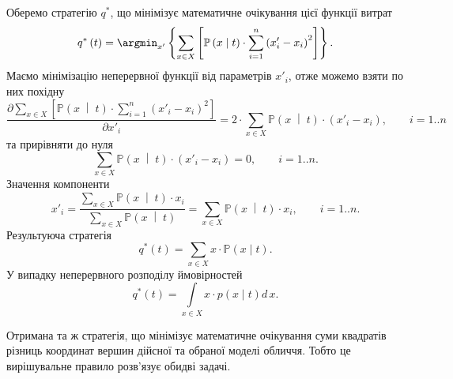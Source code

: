 Оберемо стратегію $q^*$,
що мінімізує математичне очікування цієї функції витрат
\begin{equation*}
  q^* \left( t \right)
  = \argmin_{x'} \left\{
    \sum\limits_{x \in X} \left[
        \mathbb{P} \left( x \;\middle|\;  t \right)
        \cdot \sum_{i = 1}^n \left( x'_i - x_i \right)^2
      \right]
    \right\}.
\end{equation*}
Маємо мінімізацію неперервної функції від параметрів $x'_i$,
отже можемо взяти по них похідну
\begin{equation*}
  \frac{\partial \sum\limits_{x \in X} \left[
      \mathbb{P} \left( x \;\middle|\;  t \right)
      \cdot \sum\limits_{i = 1}^n \left( x'_i - x_i \right)^2
  \right]}{\partial x'_i}
  = 2 \cdot \sum_{x \in X} \mathbb{P} \left( x \;\middle|\;  t \right)
    \cdot \left( x'_i - x_i \right), \qquad i = 1..n
\end{equation*}
та прирівняти до нуля
\begin{equation*}
  \sum_{x \in X} \mathbb{P} \left( x \;\middle|\;  t \right)
  \cdot \left( x'_i - x_i \right) = 0, \qquad i = 1..n.
\end{equation*}
Значення компоненти
\begin{equation*}
  x'_i = \frac{\sum\limits_{x \in X}
    \mathbb{P} \left( x \;\middle|\;  t \right) \cdot x_i}
    {\sum\limits_{x \in X}
      \mathbb{P} \left( x \;\middle|\;  t \right)}
  = \sum\limits_{x \in X}
    \mathbb{P} \left( x \;\middle|\;  t \right) \cdot x_i, \qquad i = 1..n.
\end{equation*}
Результуюча стратегія
\begin{equation*}
  q^*\left( t \right)
  = \sum_{x \in X} x \cdot \mathbb{P}\left( x \mid t \right).
\end{equation*}
У випадку неперервного розподілу ймовірностей
\begin{equation*}
  q^*\left( t \right)
  = \int\limits_{x \in X} x \cdot p\left( x \mid t \right) d\,x.
\end{equation*}

Отримана та ж стратегія,
що мінімізує математичне очікування суми квадратів різниць
координат вершин дійсної та обраної моделі обличчя.
Тобто це вирішувальне правило розв'язує обидві задачі.
